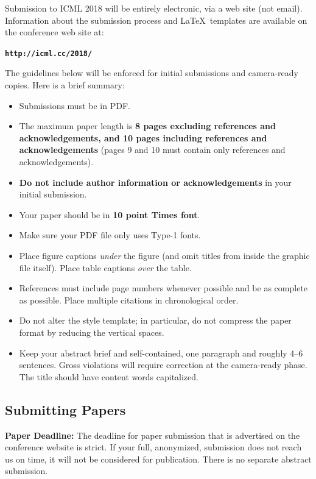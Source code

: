 \documentclass{article}
\begin{document}
Submission to ICML 2018 will be entirely electronic, via a web site
(not email). Information about the submission process and \LaTeX\ templates
are available on the conference web site at:
\begin{center}
\textbf{\texttt{http://icml.cc/2018/}}
\end{center}

The guidelines below will be enforced for initial submissions and
camera-ready copies. Here is a brief summary:
\begin{itemize}
\item Submissions must be in PDF\@.
\item The maximum paper length is \textbf{8 pages excluding references and
    acknowledgements, and 10 pages including references and acknowledgements}
    (pages 9 and 10 must contain only references and acknowledgements).
\item \textbf{Do not include author information or acknowledgements} in your
    initial submission.
\item Your paper should be in \textbf{10 point Times font}.
\item Make sure your PDF file only uses Type-1 fonts.
\item Place figure captions \emph{under} the figure (and omit titles from inside
    the graphic file itself). Place table captions \emph{over} the table.
\item References must include page numbers whenever possible and be as complete
    as possible. Place multiple citations in chronological order.
\item Do not alter the style template; in particular, do not compress the paper
    format by reducing the vertical spaces.
\item Keep your abstract brief and self-contained, one paragraph and roughly
    4--6 sentences. Gross violations will require correction at the
    camera-ready phase. The title should have content words capitalized.
\end{itemize}

\subsection{Submitting Papers}

\textbf{Paper Deadline:} The deadline for paper submission that is
advertised on the conference website is strict. If your full,
anonymized, submission does not reach us on time, it will not be
considered for publication. There is no separate abstract submission.
\end{document}
